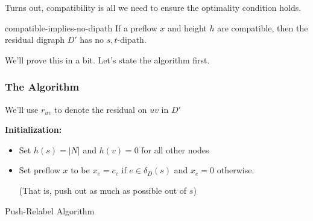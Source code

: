 Turns out, compatibility is all we need to ensure the optimality condition holds.
\begin{lemma}{}{compatible-implies-no-dipath}
    If a preflow $x$ and height $h$ are compatible, then the residual digraph $D'$ has no $s,t$-dipath.
\end{lemma}
We'll prove this in a bit. Let's state the algorithm first.

\subsubsection{The Algorithm}
\begin{note}
    We'll use $r_{uv}$ to denote the residual on $uv$ in $D'$
\end{note}

\IncMargin{1em}
\begin{algorithm}[H]\label{alg:push-relabel}
    \nl \textbf{Initialization:}
    \begin{itemize}
        \item Set $h(s) = |N|$ and $h(v) = 0$ for all other nodes 
        \item Set preflow $x$ to be $x_e = c_e$ if $e \in \delta_D(s)$ and $x_e = 0$ otherwise. 
        
        (That is, push out as much as possible out of $s$)
    \end{itemize}

    \BlankLine  
  
    \nl {}

    \caption{Push-Relabel Algorithm}
\end{algorithm}

